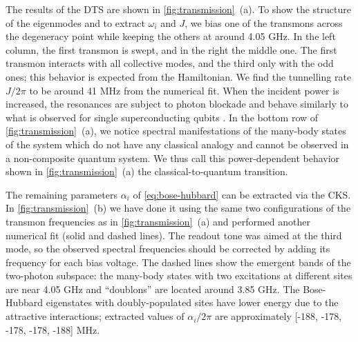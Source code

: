 \documentclass[%
 aps, prl,
 amsmath,amssymb,
 reprint,%
superscriptaddress
]{revtex4-2}
\begin{document}
The results of the DTS are shown in \autoref{fig:transmission}~(a). To show the structure of the eigenmodes and to extract $\omega_i$ and $J$, we bias one of the transmons across the degeneracy point while keeping the others at around 4.05 GHz. In the left column, the first transmon is swept, and in the right the middle one. The first transmon interacts with all collective modes, and the third only with the odd ones; this behavior is expected from the Hamiltonian. We find the tunnelling rate $J/2\pi$ to be around 41 MHz from the numerical fit. When the incident power is increased, the resonances are subject to photon blockade \cite{birnbaum2005photon} and behave similarly to what is observed for single superconducting qubits \cite{astafiev2010resonance}. In the bottom row of \autoref{fig:transmission}~(a), we notice spectral manifestations of the many-body states of the system which do not have any classical analogy and cannot be observed in a non-composite quantum system. We thus call this power-dependent behavior shown in \autoref{fig:transmission}~(a) the classical-to-quantum transition. 


The remaining parameters $\alpha_i$ of \eqref{eq:bose-hubbard} can be extracted via the CKS. In \autoref{fig:transmission}~(b) we have done it using the same two configurations of the transmon frequencies as in \autoref{fig:transmission}~(a) and performed another numerical fit (solid and dashed lines). The readout tone was aimed at the third mode, so the observed spectral frequencies should be corrected by adding its frequency for each bias voltage. The dashed lines show the emergent bands of the two-photon subspace: the many-body states with two excitations at different sites are near 4.05 GHz and ``doublons'' \cite{gorlach2018simulation} are located around 3.85 GHz. The Bose-Hubbard eigenstates with doubly-populated sites have lower energy due to the attractive interactions; extracted values of $\alpha_i/2\pi$ are approximately [-188, -178, -178, -178, -188] MHz. 
\end{document}
